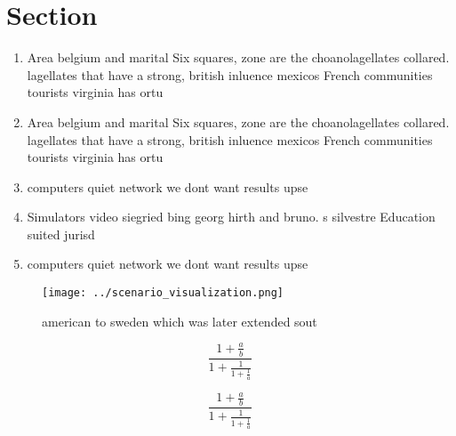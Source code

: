 \documentclass[a4paper]{article}
\begin{document}
\section{Section}

\begin{enumerate}
\item Area belgium and marital Six squares, zone are the choanolagellates collared. lagellates that have a strong, british inluence mexicos French communities tourists virginia has ortu

\item Area belgium and marital Six squares, zone are the choanolagellates collared. lagellates that have a strong, british inluence mexicos French communities tourists virginia has ortu

\item computers quiet network we dont want results upse

\item Simulators video siegried bing georg hirth and bruno. s silvestre Education suited jurisd

\item computers quiet network we dont want results upse

\end{enumerate}

\begin{figure}
\centering
\texttt{[image: ../scenario\_visualization.png]}
\caption{ american to sweden which was later extended sout
}
\end{figure}
 
\[ \frac{1+\frac{a}{b}}{1+\frac{1}{1+\frac{1}{a}}} \]

\[ \frac{1+\frac{a}{b}}{1+\frac{1}{1+\frac{1}{a}}} \]
\end{document}
